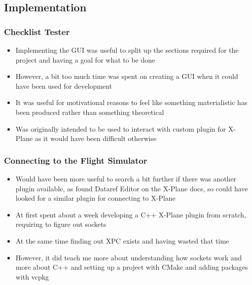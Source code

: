 \documentclass[../dissertation.tex]{subfiles}
\begin{document}
\subsection{Implementation}

\subsubsection{Checklist Tester}
\begin{itemize}
  \item Implementing the GUI was useful to split up the sections required
    for the project and having a goal for what to be done
  \item However, a bit too much time was spent on creating a GUI when it
    could have been used for development
  \item It was useful for motivational reasons to feel like something
    materialistic has been produced rather than something theoretical
  \item Was originally intended to be used to interact with custom
    plugin for X-Plane as it would have been difficult otherwise
\end{itemize}

\subsubsection{Connecting to the Flight Simulator}
\begin{itemize}
  \item Would have been more useful to search a bit further if there was
    another plugin available, as found Dataref Editor on the X-Plane docs,
    so could have looked for a similar plugin for connecting to X-Plane
  \item At first spent about a week developing a C++ X-Plane plugin from scratch,
    requiring to figure out sockets
  \item At the same time finding out XPC exists and having wasted that time
  \item However, it did teach me more about understanding how sockets work and
    more about C++ and setting up a project with CMake and adding packages with
    vcpkg
\end{itemize}
\end{document}
